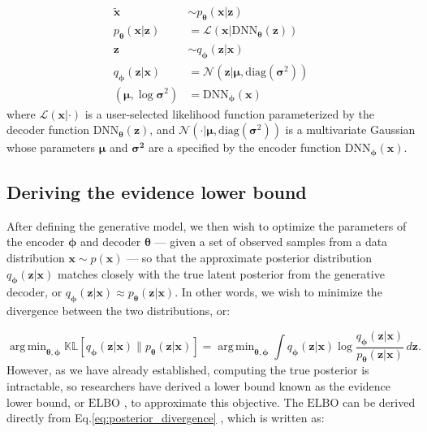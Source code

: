 \documentclass[11pt,a4paper,twoside]{book}
\DeclareMathOperator*{\argmin}{arg\,min}
\begin{document}
\begin{doublespace}
\begin{appendices}
\begin{subequations}
\begin{align}
    \tilde{\mathbf{x}} &\sim
    p_{\boldsymbol{\theta}}(\mathbf{x} | \mathbf{z}) \label{eq:recon}\\
    p_{\boldsymbol{\theta}}(\mathbf{x} | \mathbf{z}) &= \mathcal{L} \left( \mathbf{x} | \mathrm{DNN}_{\boldsymbol{\theta}}(\mathbf{z}) \right) \label{eq:likelihood}\\
    \mathbf{z} &\sim
    q_{\boldsymbol{\phi}}(\mathbf{z} | \mathbf{x})\label{eq:sample}\\
    q_{\boldsymbol{\phi}}(\mathbf{z} | \mathbf{x}) &= \mathcal{N}(\mathbf{z} | \boldsymbol{\mu}, \mathrm{diag}(\boldsymbol{\sigma}^2)) \label{eq:approx}\\
    (\boldsymbol{\mu}, \log \boldsymbol{\sigma}^2) &= \mathrm{DNN}_{\boldsymbol{\phi}}(\mathbf{x})\label{eq:encoder}
\end{align}
\end{subequations}
where $\mathcal{L}(\mathbf{x}| \cdot)$ is a user-selected likelihood function parameterized by the decoder function $\mathrm{DNN}_{\boldsymbol{\theta}}(\mathbf{z})$, and $\mathcal{N}(\cdot | \boldsymbol{\mu}, \mathrm{diag}(\boldsymbol{\sigma}^2))$ is a multivariate Gaussian whose parameters $\boldsymbol{\mu}$ and $\boldsymbol{\boldsymbol{\sigma}^2}$ are a specified by the encoder function $\mathrm{DNN}_{\boldsymbol{\phi}}(\mathbf{x})$. 

\subsection{Deriving the evidence lower bound}
\label{appendix:elbo}
After defining the generative model, we then wish to optimize the parameters of the encoder $\boldsymbol{\phi}$ and decoder $\boldsymbol{\theta}$ --- given a set of observed samples from a data distribution $\mathbf{x} \sim p(\mathbf{x})$ --- so that the approximate posterior distribution $q_{\boldsymbol{\phi}}(\mathbf{z} | \mathbf{x})$ matches closely with the true latent posterior from the generative decoder, or $q_{\boldsymbol{\phi}}(\mathbf{z} | \mathbf{x}) \approx p_{\boldsymbol{\theta}}(\mathbf{z} | \mathbf{x})$. In other words, we wish to minimize the divergence between the two distributions, or:

\begin{equation}
    \label{eq:posterior_divergence}
    \argmin_{\boldsymbol{\theta}, \boldsymbol{\phi}} \mathbb{KL}[q_{\boldsymbol{\phi}}(\mathbf{z} | \mathbf{x}) \| p_{\boldsymbol{\theta}}(\mathbf{z} | \mathbf{x})] = \argmin_{\boldsymbol{\theta}, \boldsymbol{\phi}} \int q_{\boldsymbol{\phi}}(\mathbf{z} | \mathbf{x}) \log \frac{q_{\boldsymbol{\phi}}(\mathbf{z} | \mathbf{x})}{p_{\boldsymbol{\theta}}(\mathbf{z} | \mathbf{x})} \, d{\mathbf{z}}.
\end{equation}
However, as we have already established, computing the true posterior is intractable, so researchers have derived a lower bound known as the evidence lower bound, or $\mathrm{ELBO}$ \citep{kingma2013vae}, to approximate this objective. The $\mathrm{ELBO}$ can be derived directly from Eq.\ref{eq:posterior_divergence} \citep{adams2020}, which is written as:


\end{appendices}
\end{doublespace}
\end{document}
